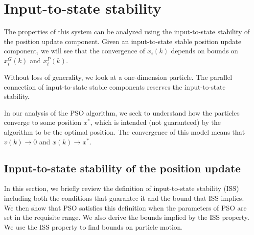 \section{Input-to-state stability}
\label{sec:iss}


The properties of this system can be analyzed using the input-to-state stability of the position update component. 
Given an input-to-state stable position update component, we will see that the convergence of $ x_{i}(k) $ depends on bounds on $ x^{G}_{i}(k) $ and $ x^{P}_{i}(k) $.

Without loss of generality, we look at a one-dimension particle.
The parallel connection of input-to-state stable components reserves the input-to-state stability.

In our analysis of the PSO algorithm, we seek to understand how the particles converge to some position $ x^{*} $, which is intended (not guaranteed) by the algorithm to be the optimal position.
The convergence of this model means that $ v(k) \rightarrow 0 $ and $ x(k) \rightarrow x^{*} $.

\subsection{Input-to-state stability of the position update}

In this section, we briefly review the definition of input-to-state stability (ISS) including both the conditions that guarantee it and the bound that ISS implies\cite{Jiang2001857}. 
We then show that PSO satisfies this definition when the parameters of PSO are set in the requisite range.
We also derive the bounds implied by the ISS property.
We use the ISS property to find bounds on particle motion.

